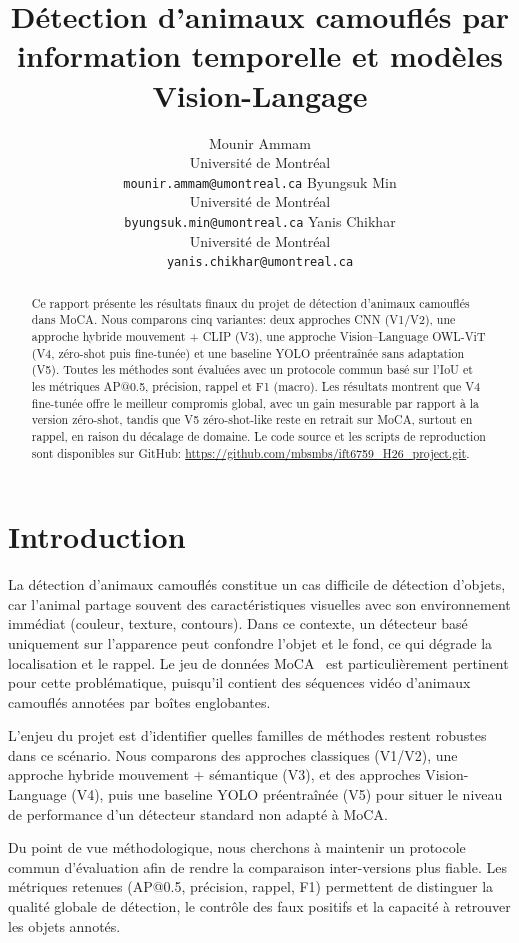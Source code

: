 \documentclass{article}
\title{Détection d’animaux camouflés par information temporelle et modèles Vision-Langage}
\author{
  Mounir Ammam \\
  Université de Montréal \\
  \texttt{mounir.ammam@umontreal.ca}
  \And
  Byungsuk Min \\
  Université de Montréal \\
  \texttt{byungsuk.min@umontreal.ca}
  \And
  Yanis Chikhar \\
  Université de Montréal \\
  \texttt{yanis.chikhar@umontreal.ca}
}
\begin{document}
\maketitle

\begin{abstract}
Ce rapport présente les résultats finaux du projet de détection d’animaux camouflés dans MoCA. Nous comparons cinq variantes: deux approches CNN (V1/V2), une approche hybride mouvement + CLIP (V3), une approche Vision--Language OWL-ViT (V4, zéro-shot puis fine-tunée) et une baseline YOLO préentraînée sans adaptation (V5). Toutes les méthodes sont évaluées avec un protocole commun basé sur l’IoU et les métriques AP@0.5, précision, rappel et F1 (macro). Les résultats montrent que V4 fine-tunée offre le meilleur compromis global, avec un gain mesurable par rapport à la version zéro-shot, tandis que V5 zéro-shot-like reste en retrait sur MoCA, surtout en rappel, en raison du décalage de domaine. Le code source et les scripts de reproduction sont disponibles sur GitHub: \url{https://github.com/mbsmbs/ift6759_H26_project.git}.
\end{abstract}

\section{Introduction}
La détection d’animaux camouflés constitue un cas difficile de détection d’objets, car l’animal partage souvent des caractéristiques visuelles avec son environnement immédiat (couleur, texture, contours). Dans ce contexte, un détecteur basé uniquement sur l’apparence peut confondre l’objet et le fond, ce qui dégrade la localisation et le rappel. Le jeu de données MoCA~\cite{li2021moca,moca_website} est particulièrement pertinent pour cette problématique, puisqu’il contient des séquences vidéo d’animaux camouflés annotées par boîtes englobantes.

L’enjeu du projet est d’identifier quelles familles de méthodes restent robustes dans ce scénario. Nous comparons des approches classiques (V1/V2), une approche hybride mouvement + sémantique (V3), et des approches Vision-Language (V4), puis une baseline YOLO préentraînée (V5) pour situer le niveau de performance d’un détecteur standard non adapté à MoCA.

Du point de vue méthodologique, nous cherchons à maintenir un protocole commun d’évaluation afin de rendre la comparaison inter-versions plus fiable. Les métriques retenues (AP@0.5, précision, rappel, F1) permettent de distinguer la qualité globale de détection, le contrôle des faux positifs et la capacité à retrouver les objets annotés.
\end{document}
